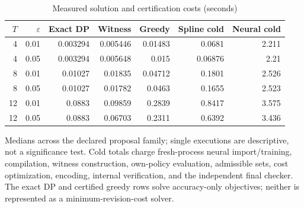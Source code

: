 \begin{table}[htbp]
\centering\footnotesize
\caption{Measured solution and certification costs (seconds)}\label{tab:timing}
\begin{tabular}{rrrrrrr}\toprule
$T$ & $\varepsilon$ & Exact DP & Witness & Greedy & Spline cold & Neural cold \\\midrule
4 & 0.01 & 0.003294 & 0.005446 & 0.01483 & 0.0681 & 2.211 \\
4 & 0.05 & 0.003294 & 0.005648 & 0.015 & 0.06876 & 2.21 \\
8 & 0.01 & 0.01027 & 0.01835 & 0.04712 & 0.1801 & 2.526 \\
8 & 0.05 & 0.01027 & 0.01782 & 0.0463 & 0.1655 & 2.523 \\
12 & 0.01 & 0.0883 & 0.09859 & 0.2839 & 0.8417 & 3.575 \\
12 & 0.05 & 0.0883 & 0.06703 & 0.2311 & 0.6392 & 3.436 \\
\bottomrule\end{tabular}
\par\smallskip\begin{minipage}{.98\textwidth}\footnotesize Medians across the declared proposal family; single executions are descriptive, not a significance test. Cold totals charge fresh-process neural import/training, compilation, witness construction, own-policy evaluation, admissible sets, cost optimization, encoding, internal verification, and the independent final checker. The exact DP and certified greedy rows solve accuracy-only objectives; neither is represented as a minimum-revision-cost solver.\end{minipage}
\end{table}
